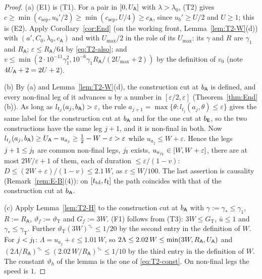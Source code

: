 \begin{proof}
(a) (E1) is (T1). For a pair in $[0,U_{\mathsf A}]$ with $\lambda>\lambda_0$, (T2) gives
$c\ge\min(c_{\mathrm{sep}},u_b'/2)\ge\min(c_{\mathrm{sep}},U/4)\ge c_{\mathsf A}$, since $u_b'\ge U/2$ and $U\ge1$; this is (E2).
Apply Corollary~\ref{cor:End} (on the working front, Lemma~\ref{lem:T2-W}(d)) with $(a',C_0,\lambda_0,c_{\mathsf A})$ and with
$U_{\max}/2$ in the role of its $U_{\max}$: its $\gamma$ and $R$ are $\gamma_1$ and $R_{\mathsf A}$; $\varepsilon\le
R_{\mathsf A}/64$ by \eqref{eq:T2-also}; and $v\le\min(2\cdot10^{-11}\gamma_1^2,10^{-6}\gamma_1R_{\mathsf A}/(2U_{\max}+2))$ by the
definition of $v_0$ (note $4U_{\mathsf A}+2=2U+2$).

(b) By (a) and Lemma~\ref{lem:T2-W}(d), the construction cut at $b_{\mathsf A}$ is defined, and every non-final leg of it advances $u$ by
a number in $[\varepsilon/2,\varepsilon]$ (Theorem~\ref{thm:End}(b)). As long as $l_{t_j}(a_j,b_{\mathsf A})>\varepsilon$, the rule
$a_{j+1}=\max\{\theta:l_{t_j}(a_j,\theta)\le\varepsilon\}$ gives the same label for the construction cut at $b_{\mathsf A}$ and for the one
cut at $b_{\mathsf E}$, so the two constructions have the same leg $j+1$, and it is non-final in both. Now
$l_{t_j}(a_j,b_{\mathsf A})\ge U_{\mathsf A}-u_{a_j}\ge\frac12-W-\varepsilon>\varepsilon$ while $u_{a_j}\le W+\varepsilon$. Hence the legs
$j+1\le j_{\mathrm I}$ are common non-final legs, $j_{\mathrm I}$ exists, $u_{a_{j_{\mathrm I}}}\in[W,W+\varepsilon]$, there are at most $2W/\varepsilon+1$
of them, each of duration $\le\varepsilon/(1-v)$: $D\le(2W+\varepsilon)/(1-v)\le2.1\,W$, as $\varepsilon\le W/100$. The last
assertion is causality (Remark~\ref{rem:E-B}(4)): on $[t_{\mathrm{td}},t_{\mathrm I}]$ the path coincides with that of the construction cut at $b_{\mathsf A}$.

(c) Apply Lemma~\ref{lem:T2-H} to the construction cut at $b_{\mathsf A}$ with $\gamma:=\gamma_*\le\gamma_1$, $R:=R_{\mathsf A}$,
$\vartheta_f:=\vartheta_{\mathrm T}$ and $G_f:=3W$. (F1) follows from (T3): $3W\le G_{\mathrm T}$, $\bar u\le1$ and $\gamma_*\le\gamma_{\mathrm T}$. Further
$\vartheta_{\mathrm T}(3W)^{\gamma_*}\le1/20$ by the second entry in the definition of $W$. For $j<j_{\mathrm I}$:
$\Lambda=u_{a_j}+\varepsilon\le1.01\,W$, so $2\Lambda\le2.02\,W\le\min(3W,R_{\mathsf A},U_{\mathsf A})$ and
$(2\Lambda/R_{\mathsf A})^{\gamma_*}\le(2.02\,W/R_{\mathsf A})^{\gamma_*}\le1/10$ by the third entry in the definition of $W$. The
constant $\vartheta_h$ of the lemma is the one of \eqref{eq:T2-const}. On non-final legs the speed is $1$.


\end{proof}
